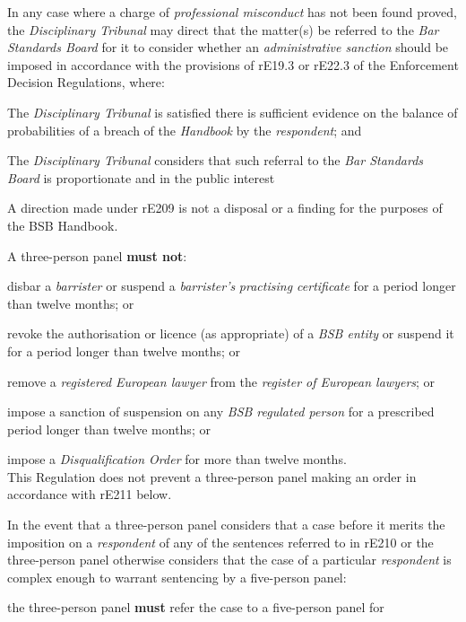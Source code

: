 In any case where a charge of \emph{professional misconduct }has not
been found proved, the \emph{Disciplinary Tribunal }may direct that the
matter(s) be referred to the \emph{Bar Standards Board }for it to
consider whether an \emph{administrative sanction }should be imposed in
accordance with the provisions of rE19.3 or rE22.3 of the Enforcement
Decision Regulations, where:\\\nl \item The \emph{Disciplinary Tribunal }is satisfied there is sufficient
evidence on the balance of probabilities of a breach of
the \emph{Handbook }by the \emph{respondent}; and\item The \emph{Disciplinary Tribunal} considers that such referral to
the \emph{Bar Standards Board} is proportionate and in the public
interest\ln
{}\par
A direction made under rE209 is not a disposal or a finding for the
purposes of the BSB Handbook.\\
\par
A three-person panel  \textcolor{myred}{\textbf{must not}}:\\\nl \item disbar a \emph{barrister} or suspend
a \emph{barrister's} \emph{practising certificate} for a period longer 
than twelve months; or\item revoke the authorisation or licence (as appropriate) of a \emph{BSB
entity} or suspend it for a period longer than twelve months; or\item remove a \emph{registered European lawyer} from the \emph{register of
European lawyers}; or\item impose a sanction of suspension on any \emph{BSB regulated
person} for a prescribed period longer than twelve months; or\item impose a \emph{Disqualification Order }for more than twelve months.\\
This Regulation does not prevent a three-person panel making an order in
accordance with rE211 below.\ln
{}\par
In the event that a three-person panel considers that a case before it
merits the imposition on a \emph{respondent }of any of the sentences
referred to in  rE210 or the three-person panel otherwise considers that
the case of a particular \emph{respondent} is complex enough to warrant
sentencing by a five-person panel:\\\nl \item the three-person panel  \textcolor{myred}{\textbf{must}} refer the case to a five-person panel for
